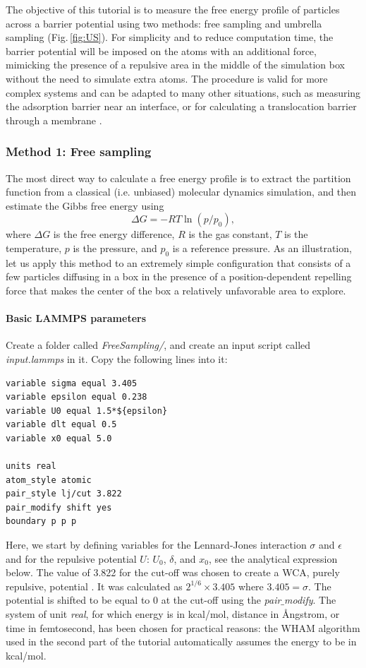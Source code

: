 \documentclass[9pt,tutorial]{livecoms}
\begin{document}
\noindent The objective of this tutorial is to measure the free energy profile of particles across a barrier potential using two methods: free sampling and umbrella sampling \cite{kastner2011umbrella, allen2017computer, frenkel2023understanding} (Fig.\,\ref{fig:US}). For simplicity and to reduce computation time, the barrier potential will be imposed on the atoms with an additional force, mimicking the presence of a repulsive area in the middle of the simulation box without the need to simulate extra atoms. The procedure is valid for more complex systems and can be adapted to many other situations, such as measuring the adsorption barrier near an interface, or for calculating a translocation barrier through a membrane \cite{wilson1997adsorption, makarov2009computer, gravelle2021adsorption}.

\subsubsection{Method 1: Free sampling}
The most direct way to calculate a free energy profile is to extract the partition function from a classical (i.e. unbiased) molecular dynamics simulation, and then estimate the Gibbs free energy using 
\begin{equation}
\Delta G = -RT \ln(p/p_0),
\label{eq:G}
\end{equation}
where $\Delta G$ is the free energy difference, $R$ is the gas constant, $T$ is the temperature, $p$ is the pressure, and $p_0$ is a reference pressure. As an illustration, let us apply this method to an extremely simple configuration that consists of a few particles diffusing in a box in the presence of a position-dependent repelling force that makes the center of the box a relatively unfavorable area to explore.

\paragraph{Basic LAMMPS parameters}
\noindent Create a folder called \textit{FreeSampling/}, and create an input script called \textit{input.lammps} in it. Copy the following lines into it:
{\normalsize \begin{verbatim}
variable sigma equal 3.405
variable epsilon equal 0.238
variable U0 equal 1.5*${epsilon}
variable dlt equal 0.5
variable x0 equal 5.0

units real
atom_style atomic
pair_style lj/cut 3.822
pair_modify shift yes
boundary p p p
\end{verbatim}}
Here, we start by defining variables for the Lennard-Jones interaction $\sigma$ and $\epsilon$ and for the repulsive potential $U$: $U_0$, $\delta$, and $x_0$, see the analytical expression below. The value of 3.822 for the cut-off was chosen to create a WCA, purely repulsive, potential \cite{weeks1971role}. It was calculated as $2^{1/6} \times 3.405$ where $3.405 = \sigma$. The potential is shifted to be equal to 0 at the cut-off using the \textit{pair$\_$modify}. The system of unit \textit{real}, for which energy is in kcal/mol, distance in Ångstrom, or time in femtosecond, has been chosen for practical reasons: the WHAM algorithm used in the second part of the tutorial automatically assumes the energy to be in kcal/mol.
\end{document}
